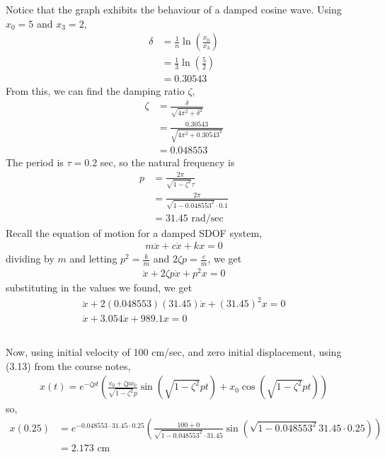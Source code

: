 Notice that the graph exhibits the behaviour of a damped cosine wave. Using $x_0= 5$ and $x_3 = 2$, 
\begin{align*}
    \delta &= \frac{1}{n} \ln\left(\frac{x_0}{x_3}\right) \\
    &= \frac{1}{3} \ln\left(\frac{5}{2}\right) \\
    &= 0.30543
\end{align*}
From this, we can find the damping ratio $\zeta$,
\begin{align*}
    \zeta &= \frac{\delta}{\sqrt{4\pi^2 + \delta^2}} \\
    &= \frac{0.30543}{\sqrt{4\pi^2 + 0.30543^2}} \\
    &= 0.048553
\end{align*}
The period is $\tau = 0.2$ sec, so the natural frequency is 
\begin{align*}
    p &= \frac{2\pi}{\sqrt{1-\zeta^2} \tau} \\
    &= \frac{2\pi}{\sqrt{1-0.048553^2} \cdot 0.1} \\
    &= 31.45 \text{ rad/sec}
\end{align*}
Recall the equation of motion for a damped SDOF system,
\begin{align*}
    m\ddot{x} + c\dot{x} + kx = 0
\end{align*}
dividing by $m$ and letting $p^2 = \frac{k}{m}$ and $2\zeta p = \frac{c}{m}$, we get
\begin{align*}
    \ddot{x} + 2\zeta p\dot{x} + p^2x = 0
\end{align*}
substituting in the values we found, we get
\begin{gather*}
    \ddot{x} + 2(0.048553)(31.45)\dot{x} + (31.45)^2x = 0 \\
    \boxed{\ddot{x} + 3.054\dot{x} + 989.1x = 0}
\end{gather*}

\subsection{}
Now, using initial velocity of 100 cm/sec, and zero initial displacement, using (3.13) from the course notes, 
\begin{align*}
    x(t) = e^{-\zeta p t}\left(\frac{v_0 + \zeta p x_0}{\sqrt{1-\zeta^2} p}\sin\left(\sqrt{1-\zeta^2}pt\right) + x_0\cos\left(\sqrt{1-\zeta^2}pt\right)\right)
\end{align*}
so,
\begin{align*}
    x(0.25) &= e^{-0.048553 \cdot 31.45 \cdot 0.25}\left(\frac{100 + 0}{\sqrt{1-0.048553^2}\cdot 31.45}\sin\left(\sqrt{1-0.048553^2}31.45\cdot 0.25\right) \right) \\
    &= \boxed{2.173 \text{ cm}}
\end{align*}